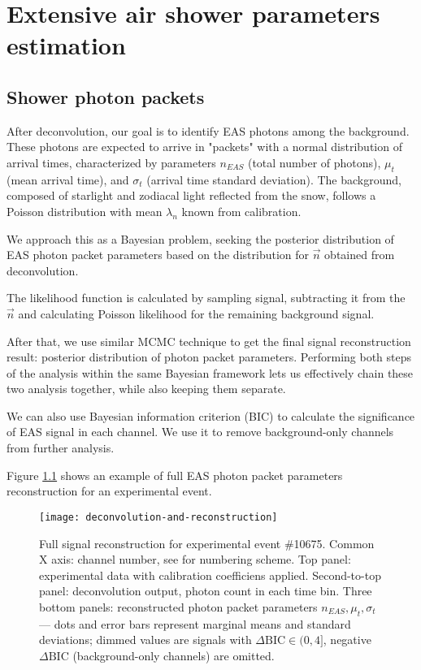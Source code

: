 \chapter{Extensive air shower parameters estimation}

\section{Shower photon packets}
\label{sec:signal-reconstruction}

After deconvolution, our goal is to identify EAS photons among the background. These photons are expected to arrive in "packets" with a normal distribution of arrival times, characterized by parameters $n_{EAS}$ (total number of photons), $\mu_t$ (mean arrival time), and $\sigma_t$ (arrival time standard deviation). The background, composed of starlight and zodiacal light reflected from the snow, follows a Poisson distribution with mean $\lambda_{n}$ known from calibration.

We approach this as a Bayesian problem, seeking the posterior distribution of EAS photon packet parameters based on the distribution for $\vec{n}$ obtained from deconvolution.

The likelihood function is calculated by sampling signal, subtracting it from the $\vec{n}$ and calculating Poisson likelihood for the remaining background signal.

After that, we use similar MCMC technique to get the final signal reconstruction result: posterior distribution of photon packet parameters. Performing both steps of the analysis within the same Bayesian framework lets us effectively chain these two analysis together, while also keeping them separate.

We can also use Bayesian information criterion (BIC) \cite{Schwarz1978} to calculate the significance of EAS signal in each channel. We use it to remove background-only channels from further analysis.

Figure \ref{pic:deconvolution-and-reconstruction} shows an example of full EAS photon packet parameters reconstruction for an experimental event.

\begin{figure}
	\centering
	\texttt{[image: deconvolution-and-reconstruction]}
	\caption{Full signal reconstruction for experimental event \#10675. Common X axis: channel number, see \cite{SphereCalibration2016} for numbering scheme. Top panel: experimental data with calibration coefficiens applied. Second-to-top panel: deconvolution output, photon count in each time bin. Three bottom panels: reconstructed photon packet parameters $n_{EAS}, \mu_t, \sigma_t$ --- dots and error bars represent marginal means and standard deviations; dimmed values are signals with $\Delta \mathrm{BIC} \in (0, 4]$, negative $\Delta \mathrm{BIC}$ (background-only channels) are omitted.}
	\label{pic:deconvolution-and-reconstruction}
\end{figure}


